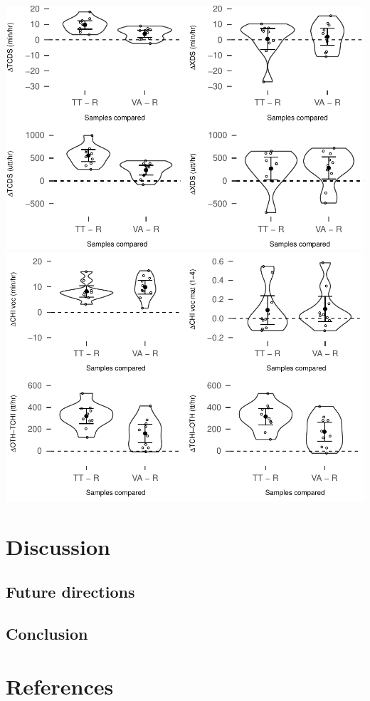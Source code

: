 \documentclass[man]{apa6}
\theoremstyle{definition}
\theoremstyle{definition}
\theoremstyle{definition}
\theoremstyle{remark}
\begin{document}
\includegraphics{Tseltal-CLE_files/figure-latex/plot_sample_differences-1.pdf}
\includegraphics{Tseltal-CLE_files/figure-latex/plot_sample_differences-2.pdf}

\section{Discussion}\label{disc}

\subsection{Future directions}\label{disc-future}

\subsection{Conclusion}\label{disc-conclusion}

\newpage

\section{References}\label{refs}

\begingroup
\setlength{\parindent}{-0.5in} \setlength{\leftskip}{0.5in}

\hypertarget{refs}{}

\endgroup
\end{document}
